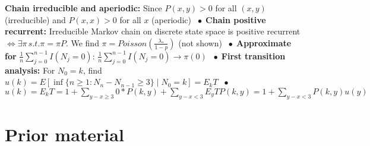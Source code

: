 \documentclass[9pt]{extarticle}
\newcommand*\bspace{$\; \bullet \;$}
\begin{document}
\textbf{Chain irreducible and aperiodic:} Since $P(x,y) > 0$ for all $(x,y)$ (irreducible) and $P(x,x) > 0$ for all $x$ (aperiodic) \bspace \textbf{Chain positive recurrent:} Irreducible Markov chain on discrete state space is positive recurrent $\Longleftrightarrow \exists \pi \, s.t. \pi = \pi P$. We find $\pi = Poisson(\frac{\lambda_*}{1 - p})$ (not shown) \bspace \textbf{Approximate for} $\frac{1}{n}\sum_{j=0}^{n-1}I(N_j = 0)$: $\frac{1}{n}\sum_{j=0}^{n-1}I(N_j = 0) \rightarrow \pi(0)$ \bspace \textbf{First transition analysis:} For $N_0 = k$, find $u(k) = E[\inf\{n\geq 1 : N_n - N_{n-1} \geq 3\} \mid N_0 = k] = E_kT$ \bspace $u(k) = E_kT = 1 + \sum_{y - x \geq 3}0 * P(k, y) + \sum_{y - x < 3} E_yTP(k,y) = 1 + \sum_{y-x<3}P(k,y)u(y)$


\section{Prior material}
\end{document}
